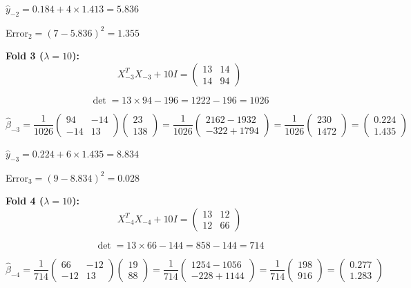 \documentclass[12pt]{article}
\begin{document}
\begin{solution}
$\hat{y}_{-2} = 0.184 + 4 \times 1.413 = 5.836$

Error$_2 = (7 - 5.836)^2 = 1.355$

\textbf{Fold 3 ($\lambda = 10$):}
\[X_{-3}^TX_{-3} + 10I = \begin{pmatrix} 13 & 14 \\ 14 & 94 \end{pmatrix}\]

\[\det = 13 \times 94 - 196 = 1222 - 196 = 1026\]

\[\hat{\beta}_{-3} = \frac{1}{1026}\begin{pmatrix} 94 & -14 \\ -14 & 13 \end{pmatrix}\begin{pmatrix} 23 \\ 138 \end{pmatrix} = \frac{1}{1026}\begin{pmatrix} 2162 - 1932 \\ -322 + 1794 \end{pmatrix} = \frac{1}{1026}\begin{pmatrix} 230 \\ 1472 \end{pmatrix} = \begin{pmatrix} 0.224 \\ 1.435 \end{pmatrix}\]

$\hat{y}_{-3} = 0.224 + 6 \times 1.435 = 8.834$

Error$_3 = (9 - 8.834)^2 = 0.028$

\textbf{Fold 4 ($\lambda = 10$):}
\[X_{-4}^TX_{-4} + 10I = \begin{pmatrix} 13 & 12 \\ 12 & 66 \end{pmatrix}\]

\[\det = 13 \times 66 - 144 = 858 - 144 = 714\]

\[\hat{\beta}_{-4} = \frac{1}{714}\begin{pmatrix} 66 & -12 \\ -12 & 13 \end{pmatrix}\begin{pmatrix} 19 \\ 88 \end{pmatrix} = \frac{1}{714}\begin{pmatrix} 1254 - 1056 \\ -228 + 1144 \end{pmatrix} = \frac{1}{714}\begin{pmatrix} 198 \\ 916 \end{pmatrix} = \begin{pmatrix} 0.277 \\ 1.283 \end{pmatrix}\]


\end{solution}
\end{document}
